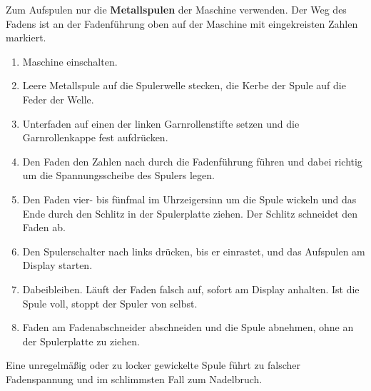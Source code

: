 \documentclass{\basedir/fablab-document}
\begin{document}
	Zum Aufspulen nur die \textbf{Metallspulen} der Maschine verwenden. Der Weg des Fadens ist an der Fadenführung oben auf der Maschine mit eingekreisten Zahlen markiert.
	\begin{enumerate}
		\item Maschine einschalten.
		\item Leere Metallspule auf die Spulerwelle stecken, die Kerbe der Spule auf die Feder der Welle.
		\item Unterfaden auf einen der linken Garnrollenstifte setzen und die Garnrollenkappe fest aufdrücken.
		\item Den Faden den Zahlen nach durch die Fadenführung führen und dabei richtig um die Spannungsscheibe des Spulers legen.
		\item Den Faden vier- bis fünfmal im Uhrzeigersinn um die Spule wickeln und das Ende durch den Schlitz in der Spulerplatte ziehen. Der Schlitz schneidet den Faden ab.
		\item Den Spulerschalter nach links drücken, bis er einrastet, und das Aufspulen am Display starten.
		\item Dabeibleiben. Läuft der Faden falsch auf, sofort am Display anhalten. Ist die Spule voll, stoppt der Spuler von selbst.
		\item Faden am Fadenabschneider abschneiden und die Spule abnehmen, ohne an der Spulerplatte zu ziehen.
	\end{enumerate}
	Eine unregelmäßig oder zu locker gewickelte Spule führt zu falscher Fadenspannung und im schlimmsten Fall zum Nadelbruch.
\end{document}
